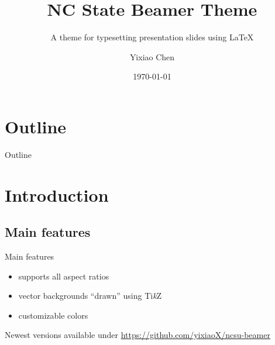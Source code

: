 \documentclass[aspectratio=169]{beamer}
\title{NC State Beamer Theme}
\subtitle{A theme for typesetting presentation slides using \LaTeX{}}
\author{Yixiao Chen}
\institute{Department of Mathematics\\NC State University}
\date{\today}
\begin{document}
\maketitle

\section*{Outline}
\begin{frame}{Outline}
	\tableofcontents
\end{frame}

\section{Introduction}
\subsection{Main features}
\begin{frame}{Main features}
  \begin{itemize}
    \item supports all aspect ratios
    \item vector backgrounds ``drawn'' using Ti\emph{k}Z
    \item customizable colors
  \end{itemize}
  \bigskip
  Newest versions available under \url{https://github.com/yixiaoX/ncsu-beamer}
\end{frame}

\end{document}
